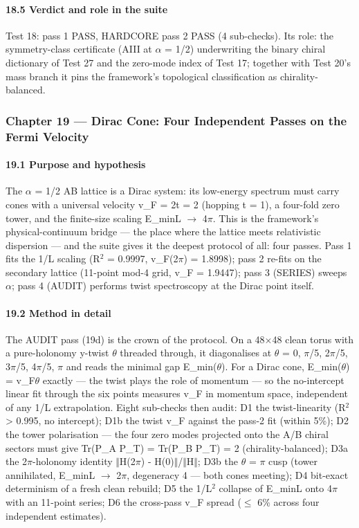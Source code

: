 \documentclass[10pt]{article}
\begin{document}
\paragraph{18.5 Verdict and role in the suite}

Test 18: pass 1 PASS, HARDCORE pass 2 PASS (4 sub-checks). Its role: the symmetry-class certificate (AIII at $\alpha$ = 1/2) underwriting the binary chiral dictionary of Test 27 and the zero-mode index of Test 17; together with Test 20's mass branch it pins the framework's topological classification as chirality-balanced.

\subsubsection{Chapter 19 --- Dirac Cone: Four Independent Passes on the Fermi Velocity}

\paragraph{19.1 Purpose and hypothesis}

The $\alpha$ = 1/2 AB lattice is a Dirac system: its low-energy spectrum must carry cones with a universal velocity v\_F = 2t = 2 (hopping t = 1), a four-fold zero tower, and the finite-size scaling E\_min\textperiodcentered{}L $\rightarrow$ 4$\pi$. This is the framework's physical-continuum bridge --- the place where the lattice meets relativistic dispersion --- and the suite gives it the deepest protocol of all: four passes. Pass 1 fits the 1/L scaling (R$^2$ = 0.9997, v\_F(2$\pi$) = 1.8998); pass 2 re-fits on the secondary lattice (11-point mod-4 grid, v\_F = 1.9447); pass 3 (SERIES) sweeps $\alpha$; pass 4 (AUDIT) performs twist spectroscopy at the Dirac point itself.

\paragraph{19.2 Method in detail}

The AUDIT pass (19d) is the crown of the protocol. On a 48$\times$48 clean torus with a pure-holonomy y-twist $\theta$ threaded through, it diagonalises at $\theta$ = 0, $\pi$/5, 2$\pi$/5, 3$\pi$/5, 4$\pi$/5, $\pi$ and reads the minimal gap E\_min($\theta$). For a Dirac cone, E\_min($\theta$) = v\_F\textperiodcentered{}$\theta$ exactly --- the twist plays the role of momentum --- so the no-intercept linear fit through the six points measures v\_F in momentum space, independent of any 1/L extrapolation. Eight sub-checks then audit: D1 the twist-linearity (R$^2$ > 0.995, no intercept); D1b the twist v\_F against the pass-2 fit (within 5\%); D2 the tower polarisation --- the four zero modes projected onto the A/B chiral sectors must give Tr(P\_A P\_T) = Tr(P\_B P\_T) = 2 (chirality-balanced); D3a the 2$\pi$-holonomy identity $\Vert$H(2$\pi$) - H(0)$\Vert$/$\Vert$H$\Vert$; D3b the $\theta$ = $\pi$ cusp (tower annihilated, E\_min\textperiodcentered{}L $\rightarrow$ 2$\pi$, degeneracy 4 --- both cones meeting); D4 bit-exact determinism of a fresh clean rebuild; D5 the 1/L$^2$ collapse of E\_min\textperiodcentered{}L onto 4$\pi$ with an 11-point series; D6 the cross-pass v\_F spread ($\le$ 6\% across four independent estimates).
\end{document}
